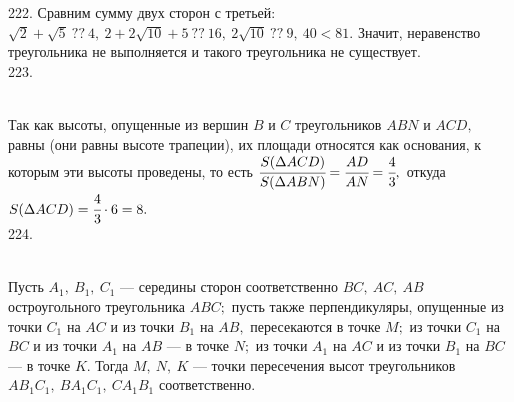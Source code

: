 \documentclass[12pt]{article}
\begin{document}
222. Сравним сумму двух сторон с третьей: $\sqrt{2}+\sqrt{5}\ ??\ 4,\ 2+2\sqrt{10}+5\ ??\ 16,\ 2\sqrt{10}\ ??\ 9,\ 40<81.$ Значит, неравенство треугольника не выполняется и такого треугольника не существует.\\
223. \begin{figure}[ht!]
\end{figure}\\
Так как высоты, опущенные из вершин $B$ и $C$ треугольников $ABN$ и $ACD,$ равны (они равны высоте трапеции), их площади относятся как основания, к которым эти высоты проведены, то есть $\cfrac{S(\Delta ACD)}{S(\Delta ABN)}=\cfrac{AD}{AN}=\cfrac{4}{3},$ откуда $S(\Delta ACD)=\cfrac{4}{3}\cdot6=8.$\\
224. \begin{figure}[ht!]
\end{figure}\\
Пусть $A_1,\ B_1,\ C_1$ --- середины сторон соответственно $BC,\ AC,\ AB$ остроугольного треугольника $ABC;$ пусть также перпендикуляры, опущенные из точки $C_1$ на $AC$ и из точки $B_1$ на $AB,$ пересекаются в точке $M;$ из точки $C_1$ на $BC$ и из точки $A_1$ на $AB$ --- в точке $N;$ из точки $A_1$ на $AC$ и из точки $B_1$ на $BC$ --- в точке $K.$ Тогда $M,\ N,\ K$ --- точки пересечения высот треугольников $AB_1C_1,\ BA_1C_1,\ CA_1B_1$ соответственно.
\end{document}
